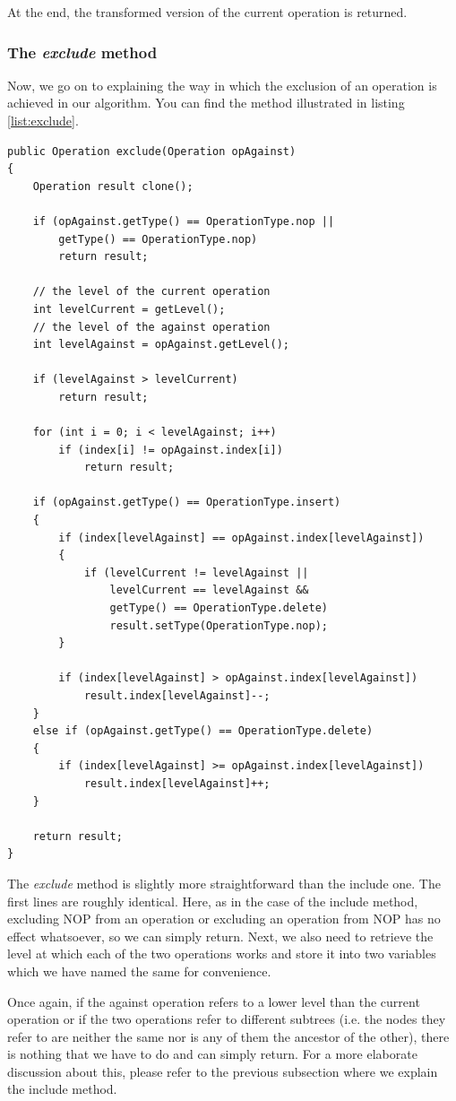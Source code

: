 At the end, the transformed version of the current operation is returned.

\subsubsection{The \emph{exclude} method}

Now, we go on to explaining the way in which the exclusion of an operation is
achieved in our algorithm. You can find the method illustrated in listing
\ref{list:exclude}.

\begin{lstlisting}[frame=lines,float=p,caption=exclude operation,label=list:exclude]
public Operation exclude(Operation opAgainst)
{
	Operation result clone();

	if (opAgainst.getType() == OperationType.nop ||
		getType() == OperationType.nop)
		return result;

	// the level of the current operation
	int levelCurrent = getLevel();
	// the level of the against operation
	int levelAgainst = opAgainst.getLevel();

	if (levelAgainst > levelCurrent)
		return result;

	for (int i = 0; i < levelAgainst; i++)
		if (index[i] != opAgainst.index[i])
			return result;

	if (opAgainst.getType() == OperationType.insert)
	{
		if (index[levelAgainst] == opAgainst.index[levelAgainst])
		{
			if (levelCurrent != levelAgainst ||
				levelCurrent == levelAgainst &&
				getType() == OperationType.delete)
				result.setType(OperationType.nop);
		}

		if (index[levelAgainst] > opAgainst.index[levelAgainst])
			result.index[levelAgainst]--;
	}
	else if (opAgainst.getType() == OperationType.delete)
	{
		if (index[levelAgainst] >= opAgainst.index[levelAgainst])
			result.index[levelAgainst]++;
	}

	return result;
}
\end{lstlisting}

The \emph{exclude} method is slightly more straightforward than the include one.
The first lines are roughly identical. Here, as in the case of the include method,
excluding NOP from an operation or excluding an operation from NOP has no effect
whatsoever, so we can simply return. Next, we also need to retrieve the level at
which each of the two operations works and store it into two variables which we
have named the same for convenience.

Once again, if the against operation refers to a lower level than the current operation
or if the two operations refer to different subtrees (i.e. the nodes they refer to
are neither the same nor is any of them the ancestor of the other), there is nothing that
we have to do and can simply return. For a more elaborate discussion about this,
please refer to the previous subsection where we explain the include method.


